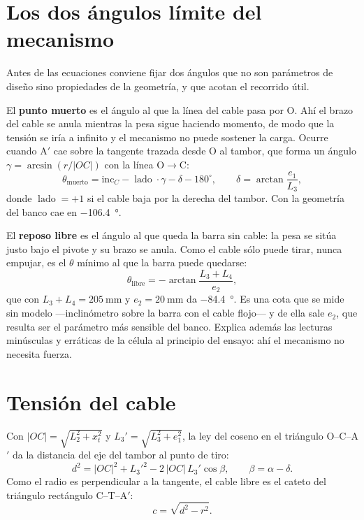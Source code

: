 \section{Los dos ángulos límite del mecanismo}

Antes de las ecuaciones conviene fijar dos ángulos que no son parámetros de diseño sino propiedades
de la geometría, y que acotan el recorrido útil.

El \textbf{punto muerto} es el ángulo al que la línea del cable pasa por O. Ahí el brazo del cable se
anula mientras la pesa sigue haciendo momento, de modo que la tensión se iría a infinito y el
mecanismo no puede sostener la carga. Ocurre cuando A$'$ cae sobre la tangente trazada desde O al
tambor, que forma un ángulo $\gamma = \arcsin(r/|OC|)$ con la línea O$\to$C:
\begin{equation}
  \theta_{\text{muerto}} = \mathrm{inc}_C - \operatorname{lado}\cdot\gamma - \delta - 180^\circ,
  \qquad \delta = \arctan\frac{e_1}{L_3},
  \label{eq:muerto}
\end{equation}
donde $\operatorname{lado} = +1$ si el cable baja por la derecha del tambor. Con la geometría del
banco cae en \SI{-106.4}{\degree}.

El \textbf{reposo libre} es el ángulo al que queda la barra sin cable: la pesa se sitúa justo bajo el
pivote y su brazo se anula. Como el cable sólo puede tirar, nunca empujar, es el $\theta$ mínimo al
que la barra puede quedarse:
\begin{equation}
  \theta_{\text{libre}} = -\arctan\frac{L_3+L_4}{e_2},
  \label{eq:libre}
\end{equation}
que con $L_3+L_4 = \SI{205}{\milli\metre}$ y $e_2 = \SI{20}{\milli\metre}$ da
\SI{-84.4}{\degree}. Es una cota que se mide sin modelo —inclinómetro sobre la barra con el cable
flojo— y de ella sale $e_2$, que resulta ser el parámetro más sensible del banco. Explica además las
lecturas minúsculas y erráticas de la célula al principio del ensayo: ahí el mecanismo no necesita
fuerza.

\section{Tensión del cable}
\label{sec:mod-tension}

Con $|OC| = \sqrt{L_2^2 + x_t^2}$ y $L_3' = \sqrt{L_3^2+e_1^2}$, la ley del coseno en el triángulo
O--C--A$'$ da la distancia del eje del tambor al punto de tiro:
\begin{equation}
  d^2 = |OC|^2 + L_3'^2 - 2\,|OC|\,L_3'\cos\beta, \qquad \beta = \alpha - \delta .
  \label{eq:dca}
\end{equation}
Como el radio es perpendicular a la tangente, el cable libre es el cateto del triángulo rectángulo
C--T--A$'$:
\begin{equation}
  c = \sqrt{d^2 - r^2}.
  \label{eq:cable}
\end{equation}

